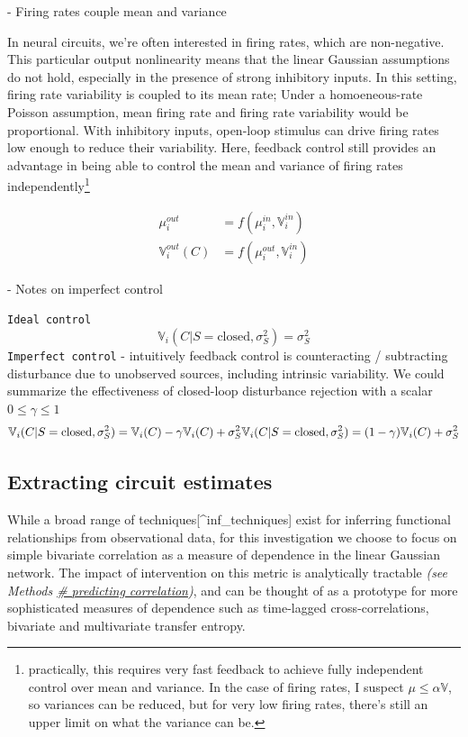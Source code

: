 \documentclass{article}
\begin{document}
-  Firing rates couple mean and variance

In neural circuits, we're often interested in firing rates, which are non-negative. This particular output nonlinearity means that the linear Gaussian assumptions do not hold, especially in the presence of strong inhibitory inputs. In this setting, firing rate variability is coupled to its mean rate; Under a homoeneous-rate Poisson assumption, mean firing rate and firing rate variability would be proportional. With inhibitory inputs, open-loop stimulus can drive firing rates low enough to reduce their variability. Here, feedback control still provides an advantage in being able to control the mean and variance of firing rates independently\footnote{practically, this requires very fast feedback to
  achieve fully independent control over mean and variance. In the case
  of firing rates, I suspect \(\mu \leq \alpha\mathbb{V}\), so variances
  can be reduced, but for very low firing rates, there's still an upper
  limit on what the variance can be.}

\[
\begin{aligned}
\mu^{out}_i &= f(\mu^{in}_i, \mathbb{V}^{in}_i)\\
\mathbb{V}^{out}_{i}(C) &= f(\mu^{out}_i, \mathbb{V}^{in}_i)
\end{aligned}
\]

-  Notes on imperfect control

\texttt{Ideal\ control} \[
\mathbb{V}_{i}(C|S=\text{closed},\sigma^2_S) = \sigma^2_S 
\] \texttt{Imperfect\ control} - intuitively feedback control is counteracting / subtracting disturbance due to unobserved sources, including intrinsic variability. We could summarize the effectiveness of closed-loop disturbance rejection with a scalar \(0\leq\gamma\leq1\) \[
\mathbb{V}_{i}(C|S=\text{closed},\sigma^2_S) = \mathbb{V}_{i}(C) - \gamma\mathbb{V}_{i}(C) + \sigma^2_S \\
\mathbb{V}_{i}(C|S=\text{closed},\sigma^2_S) = (1-\gamma) \mathbb{V}_{i}(C) + \sigma^2_S
\]

\hypertarget{sec:methods-extract-circuit}{%
\subsection{Extracting circuit estimates}\label{sec:methods-extract-circuit}}

While a broad range of techniques{[}\^{}inf\_techniques{]} exist for inferring functional relationships from observational data, for this investigation we choose to focus on simple bivariate correlation as a measure of dependence in the linear Gaussian network. The impact of intervention on this metric is analytically tractable \emph{(see Methods
\protect\hyperlink{sec:methods-predict-corr}{\# predicting correlation})}, and can be thought of as a prototype for more sophisticated measures of dependence such as time-lagged cross-correlations, bivariate and multivariate transfer entropy.
\end{document}
